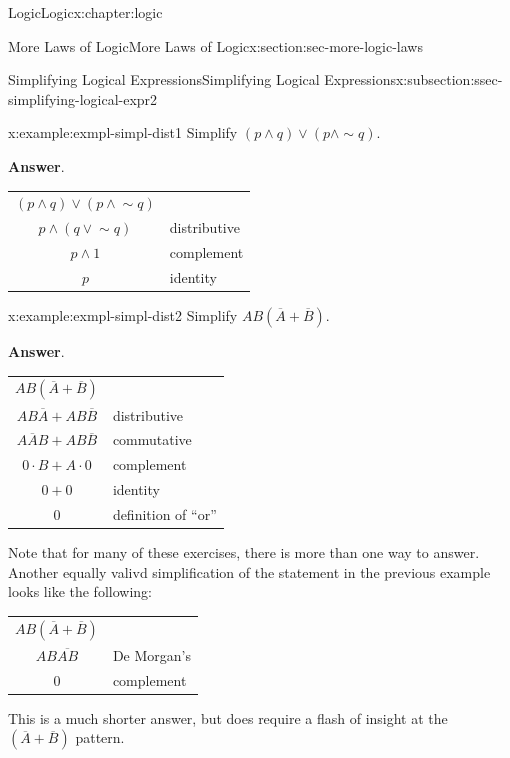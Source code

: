 \documentclass[twoside,10pt,]{book}
\newcommand{\blocktitlefont}{\relax}
\newcommand{\tabularfont}{\relax}
\numberwithin{equation}{section}
\begin{document}
\begin{chapterptx}{Logic}{}{Logic}{}{}{x:chapter:logic}
\begin{sectionptx}{More Laws of Logic}{}{More Laws of Logic}{}{}{x:section:sec-more-logic-laws}
\begin{subsectionptx}{Simplifying Logical Expressions}{}{Simplifying Logical Expressions}{}{}{x:subsection:ssec-simplifying-logical-expr2}
\begin{example}{}{x:example:exmpl-simpl-dist1}
Simplify \((p{\wedge}{}q){\vee}(p{\wedge}\sim\!{q})\).\par\smallskip%
\noindent\textbf{\blocktitlefont Answer}.\label{g:answer:idp228875240}{}\hypertarget{g:answer:idp228875240}{}\quad{}\begin{center}%
{\tabularfont%
\begin{tabular}{cc}
\((p{\wedge}{}q) {\vee}{}(p{\wedge}{}\sim\!{q}{})\)&\multicolumn{1}{l}{}\tabularnewline[0pt]
\(p{\wedge}{}(q{\vee}{}\sim\!{q}{}) \)&\multicolumn{1}{l}{distributive}\tabularnewline[0pt]
\(p{\wedge}{}1 \)&\multicolumn{1}{l}{complement}\tabularnewline[0pt]
\(p  \)&\multicolumn{1}{l}{identity}
\end{tabular}
}%
\end{center}%
\end{example}
\begin{example}{}{x:example:exmpl-simpl-dist2}%
Simplify \(AB(\overline{A}{} + \overline{B}{} )\).\par\smallskip%
\noindent\textbf{\blocktitlefont Answer}.\label{g:answer:idp228883688}{}\hypertarget{g:answer:idp228883688}{}\quad{}\begin{center}%
{\tabularfont%
\begin{tabular}{cc}
\(AB(\overline{A}{} +\overline{B}{})\)&\multicolumn{1}{l}{}\tabularnewline[0pt]
\(AB\overline{A}{}  + AB\overline{B}{}   \)&\multicolumn{1}{l}{distributive}\tabularnewline[0pt]
\(A\overline{A}{} B + AB\overline{B}{}  \)&\multicolumn{1}{l}{commutative}\tabularnewline[0pt]
\(0 \cdot B      + A\cdot 0  \)&\multicolumn{1}{l}{complement}\tabularnewline[0pt]
\(0        +       0    \)&\multicolumn{1}{l}{identity}\tabularnewline[0pt]
\(0            \)&\multicolumn{1}{l}{definition of ``or''}
\end{tabular}
}%
\end{center}%
\end{example}
Note that for many of these exercises, there is more than one way to answer.  Another equally valivd simplification of the statement in the previous example looks like the following: \begin{center}%
{\tabularfont%
\begin{tabular}{cc}
\(AB(\overline{A}{} +\overline{B}{})\)&\multicolumn{1}{l}{}\tabularnewline[0pt]
\(AB   \overline{AB} \)&\multicolumn{1}{l}{De Morgan's}\tabularnewline[0pt]
\(0 \)&\multicolumn{1}{l}{complement}
\end{tabular}
}%
\end{center}%
 This is a much shorter answer, but does require a flash of insight at the \((\overline{A} + \overline{B})\) pattern.%

\end{subsectionptx}
\end{sectionptx}
\end{chapterptx}
\end{document}
